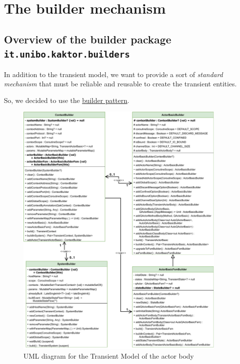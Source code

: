 \section{The builder mechanism}

\subsection{Overview of the builder package \texttt{it.unibo.kaktor.builders}}

In addition to the transient model, we want to provide a sort of \textit{standard mechanism} that must be reliable and reusable to create the transient entities.

So, we decided to use the \href{https://en.wikipedia.org/wiki/Builder_pattern}{builder pattern}.

\begin{figure}[h]
	\centering
	\includegraphics[width=0.92\textwidth]{img/[UML]it.unibo.kaktor.builders_actorb_contextb_systemb}
	\caption{UML diagram for the Transient Model of the actor body}
	\label{fig::builders_actorb_contextb_systemb}
\end{figure}

